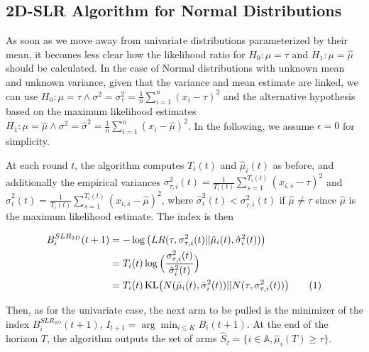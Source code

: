 \documentclass[11pt,]{article}
\newcommand{\KL}{\,\text{KL}}
\newcommand*{\Alignyesnumber}{\refstepcounter{equation}\tag{\theequation}}%
\begin{document}
\DecMargin{1em}

\subsection{2D-SLR Algorithm for Normal
Distributions}\label{d-slr-algorithm-for-normal-distributions}

As soon as we move away from univariate distributions parameterized by
their mean, it becomes less clear how the likelihood ratio for
\(H_0: \mu = \tau\) and \(H_1: \mu = \hat{\mu}\) should be calculated.
In the case of Normal distributions with unknown mean and unknown
variance, given that the variance and mean estimate are linked, we can
use
\(H_0: \mu = \tau \land \sigma^2 = \sigma^2_{\tau} = \frac{1}{n}\sum_{i=1}^{n}(x_i-\tau)^2\)
and the alternative hypothesis based on the maximum likelihood estimates
\(H_1: \mu = \hat{\mu} \land \sigma^2 = \hat{\sigma}^2 = \frac{1}{n}\sum_{i=1}^{n}(x_i-\hat{\mu})^2\).
In the following, we assume \(\epsilon = 0\) for simplicity.

At each round \(t\), the algorithm computes \(T_i(t)\) and
\(\hat{\mu}_i(t)\) as before, and additionally the empirical variances
\(\sigma_{\tau,i}^2(t) = \frac{1}{T_i(t)}\sum_{s=1}^{T_i(t)}(x_{i,s}-\tau)^2\)
and
\(\hat{\sigma}_{i}^2(t) = \frac{1}{T_i(t)}\sum_{s=1}^{T_i(t)}(x_{i,s}-\hat{\mu})^2\),
where \(\hat{\sigma}_{i}^2(t) < \sigma_{\tau,i}^2(t)\) if
\(\hat{\mu} \neq \tau\) since \(\hat{\mu}\) is the maximum likelihood
estimate. The index is then

\begin{align*}
B_i^{SLR_{2D}}(t+1) & = -\log\big(LR(\tau, \sigma_{\tau,i}^2(t)||\hat{\mu}_i(t),\hat{\sigma}^2_{i}(t))\big) \\
& = T_i(t) \log\Big(\frac{\sigma_{\tau,i}^2(t)}{\hat{\sigma}_i^2(t)}\Big) \\
& = T_i(t) \KL\big(N(\hat{\mu}_i(t),\hat{\sigma}^2_{i}(t))||N(\tau, \sigma_{\tau,i}^2(t))\big) \Alignyesnumber\label{eqn:SLR2DIndex}
\end{align*}

Then, as for the univariate case, the next arm to be pulled is the
minimizer of the index \(B_i^{SLR_{2D}}(t+1)\),
\(I_{t+1} = \arg \min_{i \leq K} B_i(t+1)\). At the end of the horizon
\(T\), the algorithm outputs the set of arms
\(\hat{S}_\tau = \{i \in \mathbb{A}, \hat{\mu}_i(T) \geq \tau\}\).

\IncMargin{1em}
\end{document}
